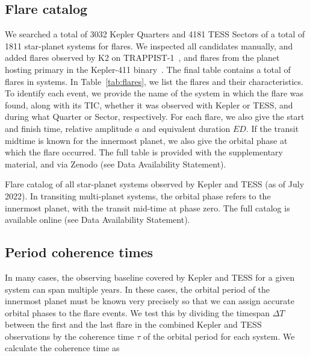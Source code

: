 \documentclass[twocolumn]{aastex631}
\begin{document}
\subsection{Flare catalog}
\label{sec:results:catalog}
We searched a total of 3032 Kepler Quarters and 4181 TESS Sectors of a total of 1811 star-planet systems for flares. We inspected all candidates manually, and added flares observed by K2 on TRAPPIST-1~\citep{paudel2018k2}, and flares from the planet hosting primary in the Kepler-411 binary~\citep{jackman2021stellara}. The final table contains a total of flares in systems. In Table~\ref{tab:flares}, we list the flares and their characteristics. To identify each event, we provide the name of the system in which the flare was found, along with its TIC, whether it was observed with Kepler or TESS, and during what Quarter or Sector, respectively. For each flare, we also give the start and finish time, relative amplitude $a$ and equivalent duration $ED$. If the transit midtime is known for the innermost planet, we also give the orbital phase at which the flare occurred. The full table is provided with the supplementary material, and via Zenodo (see Data Availability Statement).

\begin{table*}
    \centering
            \caption{
            Flare catalog of all star-planet systems observed by Kepler and TESS (as of July 2022). In transiting multi-planet systems, the orbital phase refers to the innermost planet, with the transit mid-time at phase zero. The full catalog is available online (see Data Availability Statement).
        }
    
        \label{tab:flares}
\end{table*}

\subsection{Period coherence times}
\label{sec:results:coherence}
In many cases, the observing baseline covered by Kepler and TESS for a given system can span multiple years. In these cases, the orbital period of the innermost planet must be known very precisely so that we can assign accurate orbital phases to the flare events.
We test this by dividing the timespan $\Delta T$ between the first and the last flare in the combined Kepler and TESS observations by the coherence time $\tau$ of the orbital period for each system. We calculate the coherence time as
\end{document}
